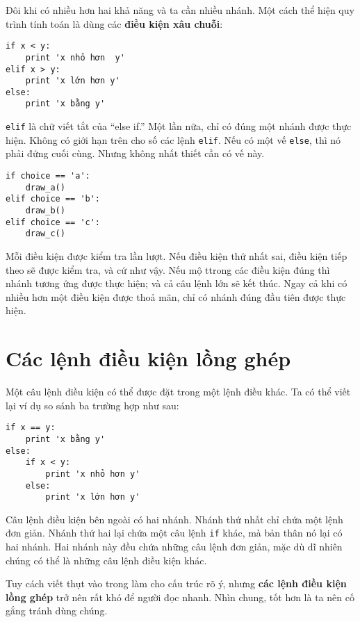 \documentclass[11pt]{book}
\begin{document}
Đôi khi có nhiều hơn hai khả năng và ta cần nhiều nhánh. Một cách thể hiện
quy trình tính toán là dùng các {\bf điều kiện xâu chuỗi}:

\beforeverb
\begin{verbatim}
if x < y:
    print 'x nhỏ hơn  y'
elif x > y:
    print 'x lớn hơn y'
else:
    print 'x bằng y'
\end{verbatim}
\afterverb
%
{\tt elif} là chữ viết tắt của ``else if.''  Một lần nữa, chỉ có đúng một
nhánh được thực hiện. Không có giới hạn trên cho số các lệnh
{\tt elif}. Nếu có một vế {\tt else}, thì nó phải đứng cuối cùng.
Nhưng không nhất thiết cần có vế này.



\beforeverb
\begin{verbatim}
if choice == 'a':
    draw_a()
elif choice == 'b':
    draw_b()
elif choice == 'c':
    draw_c()
\end{verbatim}
\afterverb
%
Mỗi điều kiện được kiểm tra lần lượt. Nếu điều kiện thứ
nhất sai, điều kiện tiếp theo sẽ được kiểm tra, và cứ
như vậy. Nếu mộ ttrong các điều kiện đúng thì nhánh
tương ứng được thực hiện; và cả câu lệnh lớn sẽ kết
thúc. Ngay cả khi có nhiều hơn một điều kiện được
thoả mãn, chỉ có nhánh đúng đầu tiên được thực hiện.


\section{Các lệnh điều kiện lồng ghép}

Một câu lệnh điều kiện có thể được đặt trong một lệnh điều khác.
Ta có thể viết lại ví dụ so sánh ba trường hợp như sau:

\beforeverb
\begin{verbatim}
if x == y:
    print 'x bằng y'
else:
    if x < y:
        print 'x nhỏ hơn y'
    else:
        print 'x lớn hơn y'
\end{verbatim}
\afterverb
% 
Câu lệnh điều kiện bên ngoài có hai nhánh. Nhánh thứ nhất
chỉ chứa một lệnh đơn giản. Nhánh thứ hai lại chứa một câu
lệnh {\tt if} khác, mà bản thân nó lại có hai nhánh.
Hai nhánh này đều chứa những câu lệnh đơn giản, mặc dù
dĩ nhiên chúng có thể là những câu lệnh điều kiện khác.

Tuy cách viết thụt vào trong làm cho cấu trúc rõ ý, nhưng 
{\bf các lệnh điều kiện lồng ghép} trở nên rất khó để người đọc nhanh.
Nhìn chung, tốt hơn là ta nên cố gắng tránh dùng chúng.
\end{document}
